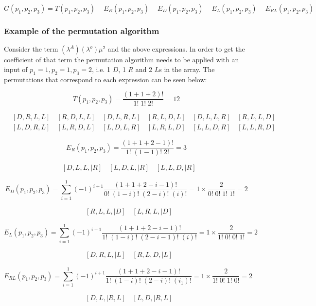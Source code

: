 \begin{equation*}
    G(p_1, p_2, p_3) = T(p_1, p_2, p_3) - E_R(p_1, p_2, p_3) - E_D(p_1, p_2, p_3) - E_L(p_1, p_2, p_3) - E_{RL}(p_1, p_2, p_3)
\end{equation*}

\subsubsection{Example of the permutation algorithm}
Consider the term \((\lambda^A) (\lambda^o) \mu^2\) and the above expressions.
In order to get the coefficient of that term the permutation algorithm needs to be applied with an input of \(p_1=1, p_2=1, p_3=2\), i.e. 1 \(D\), 1 \(R\) and 2 \(L\)s in the array.
The permutations that correspond to each expression can be seen below:

\begin{equation*}
    T(p_1, p_2, p_3) = \frac{(1+1+2)!}{1! \; 1! \; 2!} = 12
\end{equation*}

\begin{align*}
    & [D, R, L, L] \quad [R, D, L, L] \quad [D, L, R, L] \quad [R, L, D, L] \quad [D, L, L, R] \quad [R, L, L, D] \\
    & [L, D, R, L] \quad [L, R, D, L] \quad [L, D, L, R] \quad [L, R, L, D] \quad [L, L, D, R] \quad [L, L, R, D]
\end{align*}

\begin{equation*}
    E_R(p_1, p_2, p_3) = \frac{(1+1+2-1)!}{1! \; (1-1)! \; 2!} = 3
\end{equation*}

\begin{align*}
    & [D, L, L, | R] \quad [L, D, L, | R] \quad [L, L, D, | R]
\end{align*}


\begin{equation*}
    E_D(p_1, p_2, p_3) = \sum_{i=1}^{1} (-1)^{i+1} \frac{(1+1+2-i-1)!}{0! \; (1-i)! \; (2-i)! \; (i)!} = 1 \times \frac{2}{0! \; 0! \; 1! \; 1!} = 2
\end{equation*}

\begin{align*}
    & [R, L, L, | D] \quad [L, R, L, | D] 
\end{align*}


\begin{equation*}
    E_L(p_1, p_2, p_3) = \sum_{i=1}^{1} (-1)^{i+1} \frac{(1+1+2-i-1)!}{1! \; (1-i)! \; (2-i-1)! \; (i)!} = 1 \times \frac{2}{1! \; 0! \; 0! \; 1!} = 2
\end{equation*}

\begin{align*}
    & [D, R, L, | L] \quad [R, L, D, | L] 
\end{align*}


\begin{equation*}
    E_{RL}(p_1, p_2, p_3) = \sum_{i=1}^{1} (-1)^{i+1} \frac{(1+1+2-i-1)!}{1! \; (1-i)! \; (2-i)! \; (i_1)!} = 1 \times \frac{2}{1! \; 0! \; 1! \; 0!} = 2
\end{equation*}

\begin{align*}
    & [D, L, | R, L] \quad [L, D, | R, L] 
\end{align*}